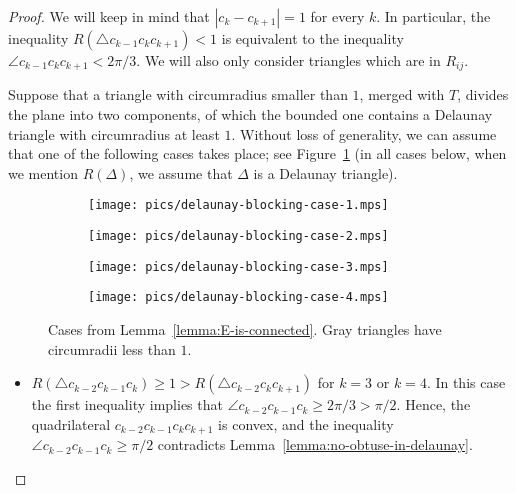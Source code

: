 \begin{appendices}
\begin{proof}
We will keep in mind that $|c_k - c_{k+1}| = 1$ for every $k$. In particular, the inequality $R(\triangle c_{k-1}c_kc_{k+1}) < 1$ is equivalent to the inequality $\angle c_{k-1}c_kc_{k+1} < 2\pi/3$. We will also only consider triangles which are in $R_{ij}$.

Suppose that a triangle with circumradius smaller than $1$, merged with $T$, divides the plane into two components, of which the bounded one contains a Delaunay triangle with circumradius at least $1$. Without loss of generality, we can assume that one of the following cases takes place; see Figure~\ref{fig:delaunay-blocking-cases} (in all cases below, when we mention $R(\Delta)$, we assume that $\Delta$ is a Delaunay triangle).

\begin{figure}[h!]
    \centering
    \begin{subfigure}[t]{.48\textwidth}
    \texttt{[image: pics/delaunay-blocking-case-1.mps]}
    \end{subfigure}
    \begin{subfigure}[t]{.48\textwidth}
    \texttt{[image: pics/delaunay-blocking-case-2.mps]}
    \end{subfigure}
    \begin{subfigure}[t]{.48\textwidth}
    \texttt{[image: pics/delaunay-blocking-case-3.mps]}
    \end{subfigure}
    \begin{subfigure}[t]{.48\textwidth}
    \texttt{[image: pics/delaunay-blocking-case-4.mps]}
    \end{subfigure}
    \caption{Cases from Lemma~\ref{lemma:E-is-connected}. Gray triangles have circumradii less than $1$.}
    \label{fig:delaunay-blocking-cases}
\end{figure}

\begin{itemize}
    \item $R(\triangle c_{k-2}c_{k-1}c_k)\geq 1 > R(\triangle c_{k-2}c_kc_{k+1})$ for $k = 3$ or $k = 4$. %
    In this case the first inequality implies that $\angle c_{k-2}c_{k-1}c_k\geq 2\pi/3 > \pi/2$. Hence, the quadrilateral $c_{k-2}c_{k-1}c_kc_{k+1}$ is convex, and the inequality $\angle c_{k-2}c_{k-1}c_k\geq \pi/2$ contradicts Lemma~\ref{lemma:no-obtuse-in-delaunay}.
    

\end{itemize}
\end{proof}
\end{appendices}
